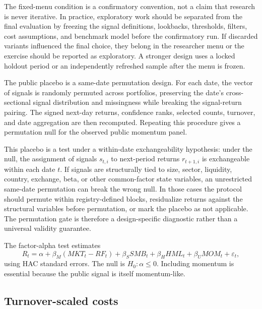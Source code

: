 \documentclass[12pt,a4paper]{article}
\begin{document}
The fixed-menu condition is a confirmatory convention, not a claim that
research is never iterative.  In practice, exploratory work should be
separated from the final evaluation by freezing the signal definitions,
lookbacks, thresholds, filters, cost assumptions, and benchmark model
before the confirmatory run.  If discarded variants influenced the final
choice, they belong in the researcher menu or the exercise should be
reported as exploratory.  A stronger design uses a locked holdout period
or an independently refreshed sample after the menu is frozen.

The public placebo is a same-date permutation design.  For each date,
the vector of signals is randomly permuted across portfolios, preserving
the date's cross-sectional signal distribution and missingness while
breaking the signal-return pairing.  The signed next-day returns,
confidence ranks, selected counts, turnover, and date aggregation are
then recomputed.  Repeating this procedure gives a permutation null for
the observed public momentum panel.

This placebo is a test under a within-date exchangeability hypothesis:
under the null, the assignment of signals \(s_{t,i}\) to next-period
returns \(r_{t+1,i}\) is exchangeable within each date \(t\).  If signals
are structurally tied to size, sector, liquidity, country, exchange,
beta, or other common-factor state variables, an unrestricted same-date
permutation can break the wrong null.  In those cases the protocol should
permute within registry-defined blocks, residualize returns against the
structural variables before permutation, or mark the placebo as not
applicable.  The permutation gate is therefore a design-specific
diagnostic rather than a universal validity guarantee.

The factor-alpha test estimates
\begin{equation}
  R_t = \alpha + \beta_M(MKT_t-RF_t)+\beta_S SMB_t
  +\beta_H HML_t+\beta_U MOM_t+\varepsilon_t ,
  \label{eq:alpha}
\end{equation}
using HAC standard errors.  The null is \(H_0:\alpha\le0\).  Including
momentum is essential because the public signal is itself momentum-like.

\subsection{Turnover-scaled costs}
\end{document}
